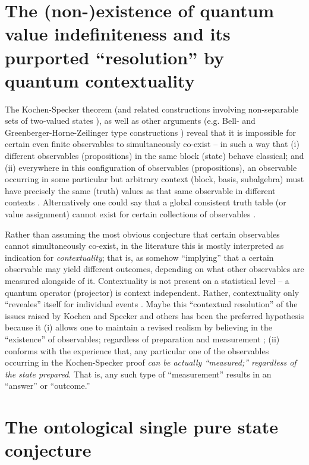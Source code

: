 \documentclass[%
 preprint,
 showpacs,
 showkeys,
 preprintnumbers,
 amsmath,amssymb,
 aps,
  pra,
  longbibliography,
 ]{revtex4-1}
\begin{document}
\section{The (non-)existence of quantum value indefiniteness and its purported ``resolution'' by quantum contextuality}

The Kochen-Specker theorem (and related constructions involving non-separable sets of two-valued states \cite[$\Gamma_3$]{kochen1}),
as well as other arguments (e.g. Bell- and Greenberger-Horne-Zeilinger type constructions \cite{mermin-93})
reveal that it is impossible for certain even finite observables to simultaneously co-exist -- in such a way
that
(i) different observables (propositions)  in the same block (state) behave classical; and
(ii) everywhere in this configuration of observables (propositions), an observable occurring in some particular but arbitrary context (block, basis, subalgebra)
must have precisely the same (truth) values
as that same observable in different contexts \cite{svozil-2008-ql}.
Alternatively one could say that a global consistent truth table (or value assignment)
cannot exist for certain collections of observables \cite{peres222,svozil_2010-pc09,svozil-2011-enough}.

Rather than assuming the most obvious conjecture that certain observables cannot simultaneously co-exist,
in the literature \cite{bohr-1949,bell-66,hey-red,redhead}
this is mostly interpreted as indication for {\em contextuality};
that is, as somehow ``implying'' that a certain observable may yield different outcomes,
depending on what other observables are measured alongside of it.
Contextuality is not present on a statistical level -- a quantum operator (projector) is context independent.
Rather, contextuality only ``reveales'' itself for individual events \cite{svozil:040102,svozil_2010-pc09,svozil-2011-enough}.
Maybe this ``contextual resolution'' of the issues raised by Kochen and Specker and others
has been the preferred hypothesis because it
(i) allows one to maintain a revised realism by believing in the ``existence'' of observables;
regardless of preparation and measurement  \cite{stace1};
(ii) conforms with the experience that,  any particular one of the observables occurring in the
Kochen-Specker proof {\em can be actually ``measured;'' regardless of the state prepared}.
That is,
any such type of ``measurement'' results in an ``answer'' or ``outcome.''


\section{The ontological single pure state conjecture}
\end{document}
